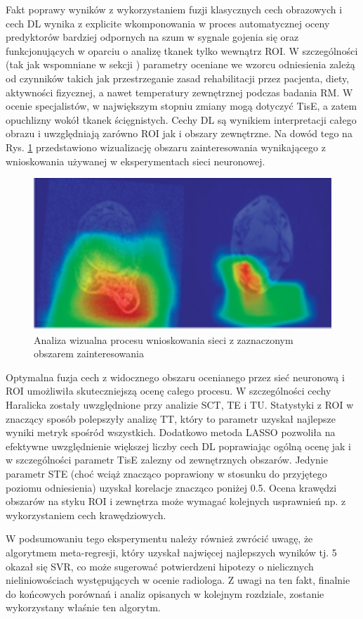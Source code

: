 Fakt poprawy wyników z wykorzystaniem fuzji klasycznych cech obrazowych i cech DL wynika z explicite wkomponowania w proces automatycznej oceny predyktorów bardziej odpornych na szum w sygnale gojenia się oraz funkcjonujących w oparciu o analizę tkanek tylko wewnątrz ROI. W szczególności (tak jak wspomniane w sekcji ) parametry oceniane we wzorcu odniesienia zależą od czynników takich jak przestrzeganie zasad rehabilitacji przez pacjenta, diety, aktywności fizycznej, a nawet temperatury zewnętrznej podczas badania RM. W ocenie specjalistów, w największym stopniu zmiany mogą dotyczyć TisE, a zatem opuchlizny wokół tkanek ścięgnistych. Cechy DL są wynikiem interpretacji całego obrazu i uwzględniają zarówno ROI jak i obszary zewnętrzne. Na dowód tego na Rys. \ref{fig:XAI} przedstawiono wizualizację obszaru zainteresowania wynikającego z wnioskowania używanej w eksperymentach sieci neuronowej.       
\begin{figure}[h]
	\centering
	\includegraphics[width=1\textwidth]{figures/XAI.png}
	\caption{Analiza wizualna procesu wnioskowania sieci z zaznaczonym obszarem zainteresowania}\label{fig:XAI}
\end{figure}

Optymalna fuzja cech z widocznego obszaru ocenianego przez sieć neuronową i ROI umożliwiła skuteczniejszą ocenę całego procesu. W szczególności cechy Haralicka zostały uwzględnione przy analizie SCT, TE i TU. Statystyki z ROI w znaczący sposób polepszyły analizę TT, który to parametr uzyskał najlepsze wyniki metryk spośród wszystkich. Dodatkowo metoda LASSO pozwoliła na efektywne uwzględnienie większej liczby cech DL poprawiając ogólną ocenę jak i w szczególności parametr TisE zalezny od zewnętrznych obszarów. Jedynie parametr STE (choć wciąż znacząco poprawiony w stosunku do przyjętego poziomu odniesienia) uzyskał korelacje znacząco poniżej 0.5. Ocena krawędzi obszarów na styku ROI i zewnętrza może wymagać kolejnych usprawnień np. z wykorzystaniem cech krawędziowych.
 
W podsumowaniu tego eksperymentu należy również zwrócić uwagę, że algorytmem meta-regresji, który uzyskał najwięcej najlepszych wyników tj. 5 okazał się SVR, co może sugerować potwierdzeni hipotezy o nielicznych nieliniowościach występujących w ocenie radiologa. Z uwagi na ten fakt, finalnie do końcowych porównań i analiz opisanych w kolejnym rozdziale, zostanie wykorzystany właśnie ten algorytm.


